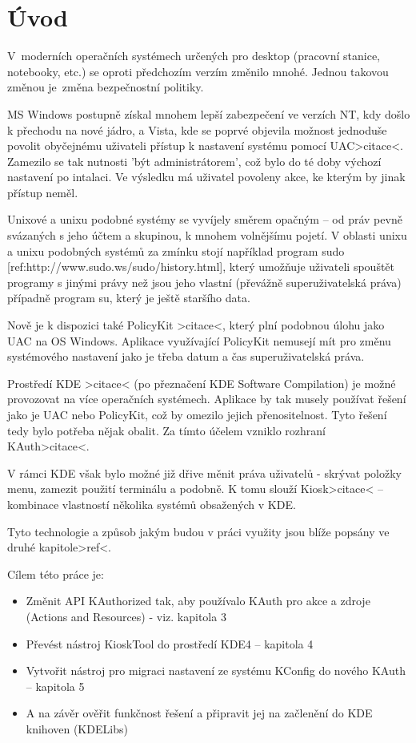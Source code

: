 \chapter{Úvod}
V~moderních operačních systémech určených pro desktop (pracovní stanice,
notebooky, etc.) se oproti předchozím verzím změnilo mnohé. Jednou takovou
změnou je~změna bezpečnostní politiky.

MS Windows postupně získal mnohem lepší zabezpečení ve verzích NT, kdy došlo
k přechodu na nové jádro, a Vista, kde se poprvé objevila možnost jednoduše
povolit obyčejnému uživateli přístup k nastavení systému pomocí UAC>citace<.
Zamezilo se tak nutnosti 'být administrátorem', což bylo do té doby výchozí
nastavení po intalaci. Ve výsledku má uživatel povoleny akce, ke kterým by jinak
přístup neměl.

Unixové a unixu podobné systémy se vyvíjely směrem opačným -- od práv pevně
svázaných s jeho účtem a skupinou, k mnohem volnějšímu pojetí. V oblasti unixu
a unixu podobných systémů za zmínku stojí například program sudo
[ref:http://www.sudo.ws/sudo/history.html], který umožňuje uživateli spouštět
programy s jinými právy než jsou jeho vlastní (převážně superuživatelská práva)
případně program su, který je ještě staršího data.

Nově je k dispozici také PolicyKit >citace<, který plní podobnou úlohu jako UAC
na OS Windows. Aplikace využívající PolicyKit nemusejí mít pro změnu systémového
nastavení jako je třeba datum a čas superuživatelská práva.

Prostředí KDE >citace< (po přeznačení KDE Software Compilation) je možné
provozovat na více operačních systémech. Aplikace by tak musely používat řešení
jako je UAC nebo PolicyKit, což by omezilo jejich přenositelnost. Tyto řešení
tedy bylo potřeba nějak obalit. Za tímto účelem vzniklo rozhraní KAuth>citace<.

V rámci KDE však bylo možné již dřive měnit práva uživatelů - skrývat položky
menu, zamezit použití terminálu a podobně. K tomu slouží Kiosk>citace<
-- kombinace vlastností několika systémů obsažených v KDE.

Tyto technologie a způsob jakým budou v práci využity jsou blíže popsány ve
druhé kapitole>ref<.

Cílem této práce je:
\begin{itemize}
\item Změnit API KAuthorized tak, aby používalo KAuth pro akce a zdroje (Actions
 and Resources) - viz. kapitola 3
\item Převést nástroj KioskTool do prostředí KDE4 -- kapitola 4
\item Vytvořit nástroj pro migraci nastavení ze systému KConfig do nového KAuth
-- kapitola 5
\item A na závěr ověřit funkčnost řešení a připravit jej na začlenění do KDE
knihoven (KDELibs)
\end{itemize}

